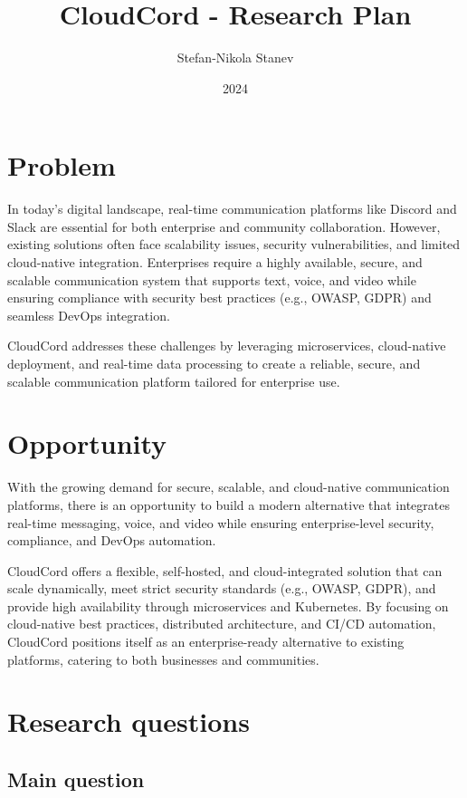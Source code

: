 \documentclass[12pt]{report}
\author{Stefan-Nikola Stanev}
\title{CloudCord - Research Plan}
\date{2024}
\begin{document}
\maketitle

\tableofcontents


\chapter{Problem}

In today’s digital landscape, real-time communication platforms like Discord and Slack are essential for both enterprise and community collaboration. However, existing solutions often face scalability issues, security vulnerabilities, and limited cloud-native integration. Enterprises require a highly available, secure, and scalable communication system that supports text, voice, and video while ensuring compliance with security best practices (e.g., OWASP, GDPR) and seamless DevOps integration.

CloudCord addresses these challenges by leveraging microservices, cloud-native deployment, and real-time data processing to create a reliable, secure, and scalable communication platform tailored for enterprise use.


\chapter{Opportunity}

With the growing demand for secure, scalable, and cloud-native communication platforms, there is an opportunity to build a modern alternative that integrates real-time messaging, voice, and video while ensuring enterprise-level security, compliance, and DevOps automation.

CloudCord offers a flexible, self-hosted, and cloud-integrated solution that can scale dynamically, meet strict security standards (e.g., OWASP, GDPR), and provide high availability through microservices and Kubernetes. By focusing on cloud-native best practices, distributed architecture, and CI/CD automation, CloudCord positions itself as an enterprise-ready alternative to existing platforms, catering to both businesses and communities.


\chapter{Research questions}

\section{Main question}
\end{document}
